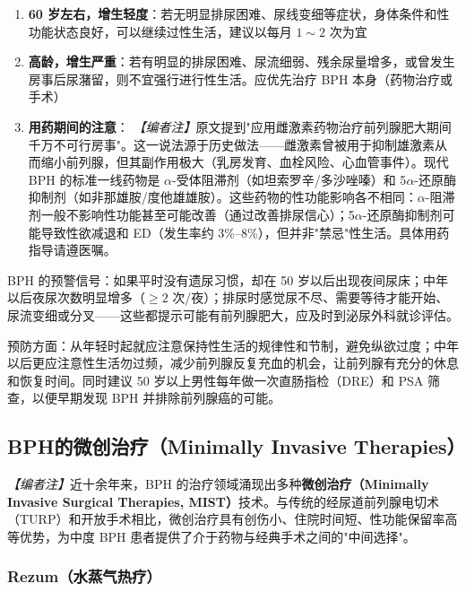 \begin{enumerate}
	\item \textbf{60 岁左右，增生轻度}：若无明显排尿困难、尿线变细等症状，身体条件和性功能状态良好，可以继续过性生活，建议以每月 $1\sim2$ 次为宜

	\item \textbf{高龄，增生严重}：若有明显的排尿困难、尿流细弱、残余尿量增多，或曾发生房事后尿潴留，则不宜强行进行性生活。应优先治疗 BPH 本身（药物治疗或手术）

	\item \textbf{用药期间的注意}：
	\noindent\textit{【编者注】}原文提到"应用雌激素药物治疗前列腺肥大期间千万不可行房事"。这一说法源于历史做法——雌激素曾被用于抑制雄激素从而缩小前列腺，但其副作用极大（乳房发育、血栓风险、心血管事件）。现代 BPH 的标准一线药物是 $\alpha$-受体阻滞剂（如坦索罗辛/多沙唑嗪）和 5$\alpha$-还原酶抑制剂（如非那雄胺/度他雄雄胺）。这些药物的性功能影响各不相同：$\alpha$-阻滞剂一般不影响性功能甚至可能改善（通过改善排尿信心）；5$\alpha$-还原酶抑制剂可能导致性欲减退和 ED（发生率约 3\%--8\%），但并非"禁忌"性生活。具体用药指导请遵医嘱。
\end{enumerate}

\begin{tcolorbox}[colback=pink!5!white,colframe=red!50~50!black,title=贴心小叮咛]
BPH 的预警信号：如果平时没有遗尿习惯，却在 50 岁以后出现夜间尿床；中年以后夜尿次数明显增多（$\geq2$ 次/夜）；排尿时感觉尿不尽、需要等待才能开始、尿流变细或分叉——这些都提示可能有前列腺肥大，应及时到泌尿外科就诊评估。

预防方面：从年轻时起就应注意保持性生活的规律性和节制，避免纵欲过度；中年以后更应注意性生活勿过频，减少前列腺反复充血的机会，让前列腺有充分的休息和恢复时间。同时建议 50 岁以上男性每年做一次直肠指检（DRE）和 PSA 筛查，以便早期发现 BPH 并排除前列腺癌的可能。
\end{tcolorbox}

\subsection{BPH的微创治疗（Minimally Invasive Therapies）}
\label{subsec:bph_minitreatment}

\noindent\textit{【编者注】}近十余年来，BPH 的治疗领域涌现出多种\textbf{微创治疗（Minimally Invasive Surgical Therapies, MIST）}技术。与传统的经尿道前列腺电切术（TURP）和开放手术相比，微创治疗具有创伤小、住院时间短、性功能保留率高等优势，为中度 BPH 患者提供了介于药物与经典手术之间的"中间选择"。

\subsubsection{Rezum（水蒸气热疗）}

